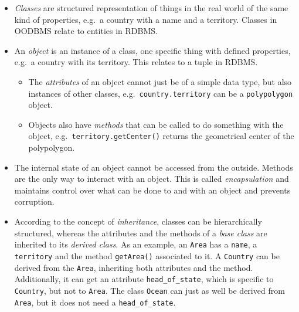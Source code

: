 \begin{itemize}
  \item \emph{Classes} are structured representation of things in the real world of the same kind of properties, e.g.\ a country with a name and a territory. Classes in OODBMS relate to entities in RDBMS.
  \item An \emph{object} is an instance of a class, one specific thing with defined properties, e.g.\ a country with its territory. This relates to a tuple in RDBMS.
  \begin{itemize}
    \item The \emph{attributes} of an object cannot just be of a simple data type, but also instances of other classes, e.g.\ \texttt{country.territory} can be a \texttt{polypolygon} object.
    \item Objects also have \emph{methods} that can be called to do something with the object, e.g.\ \texttt{territory.getCenter()} returns the geometrical center of the polypolygon.
  \end{itemize}
  \item The internal state of an object cannot be accessed from the outside. Methods are the only way to interact with an object. This is called \emph{encapsulation} and maintains control over what can be done to and with an object and prevents corruption.
  \item According to the concept of \emph{inheritance}, classes can be hierarchically structured, whereas the attributes and the methods of a \emph{base class} are inherited to its \emph{derived class}. As an example, an \texttt{Area} has a \texttt{name}, a \texttt{territory} and the method \texttt{getArea()} associated to it. A \texttt{Country} can be derived from the \texttt{Area}, inheriting both attributes and the method. Additionally, it can get an attribute \texttt{head\_of\_state}, which is specific to \texttt{Country}, but not to \texttt{Area}. The class \texttt{Ocean} can just as well be derived from \texttt{Area}, but it does not need a \texttt{head\_of\_state}.
\end{itemize}

